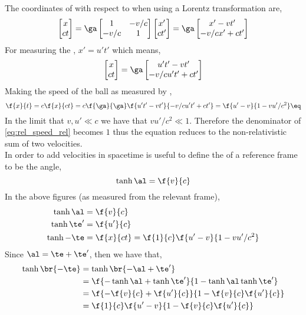 \documentclass{article}
\begin{document}
The coordinates of  with respect to  when using a Lorentz transformation are,
\[ \sqm{x \\ ct} = \ga\sqm{1 & - v / c \\ - v /c & 1} \sqm{x' \\ ct'} = \ga \sqm{x' - v t' \\ -  v /c x' + c t'} \]
For  measuring the , $x' = u' t'$ which means,
\[ \sqm{x \\ ct} = \ga \sqm{u' t' - v t' \\ -  v /c u' t' + c t'} \]
Making the speed of the ball as measured by ,
\[ \f{x}{t} = c \f{x}{ct} = c\f{\ga}{\ga} \f{u' t' - v t'}{-  v /c u' t' + c t'} = \f{u' - v}{1 - vu' /c^2} \eq \label{eq:rel_speed_rel}\]
In the limit that $v, u' \ll c$ we have that $v u' /c^2 \ll 1$. Therefore the denominator of \cref{eq:rel_speed_rel} becomes $1$ thus the equation reduces to the non-relativistic sum of two velocities.\\
In order to add velocities in spacetime is useful to define the  of a reference frame to be the angle,
\[ \tanh \al = \f{v}{c} \]
In the above figures (as measured from the relevant frame),
\begin{align*}
    \tanh \al &= \f{v}{c} \\
    \tanh \te' &= \f{u'}{c} \\
    \tanh -\te &= \f{x}{c t} = \f{1}{c} \f{u' - v}{1 - vu' /c^2}
\end{align*}
Since $\al = \te + \te'$, then we have that,
\begin{align*}
\tanh \br{-\te}
&= \tanh\br{-\al + \te'} \\
&= \f{-\tanh \al + \tanh \te'}{1 - \tanh \al\tanh \te'} \\
&= \f{-\f{v}{c} + \f{u'}{c}}{1 - \f{v}{c}\f{u'}{c}} \\
&= \f{1}{c}\f{u' - v}{1 - \f{v}{c}\f{u'}{c}}
\end{align*}
\end{document}
